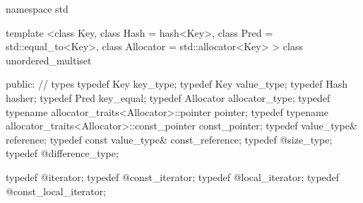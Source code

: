 %
\begin{codeblock}
namespace std {
  template <class Key,
            class Hash  = hash<Key>,
            class Pred  = std::equal_to<Key>,
            class Allocator = std::allocator<Key> >
  class unordered_multiset
  {
  public:
    // types
    typedef Key                                                 key_type;
    typedef Key                                                 value_type;
    typedef Hash                                                hasher;
    typedef Pred                                                key_equal;
    typedef Allocator                                           allocator_type;
    typedef typename allocator_traits<Allocator>::pointer       pointer;
    typedef typename allocator_traits<Allocator>::const_pointer const_pointer;
    typedef value_type&                                         reference;
    typedef const value_type&                                   const_reference;
    typedef @\impdef@                              size_type;
    typedef @\impdef@                              difference_type;

    typedef @\impdef@                              iterator;
    typedef @\impdef@                              const_iterator;
    typedef @\impdef@                              local_iterator;
    typedef @\impdef@                              const_local_iterator;

}}
\end{codeblock}
